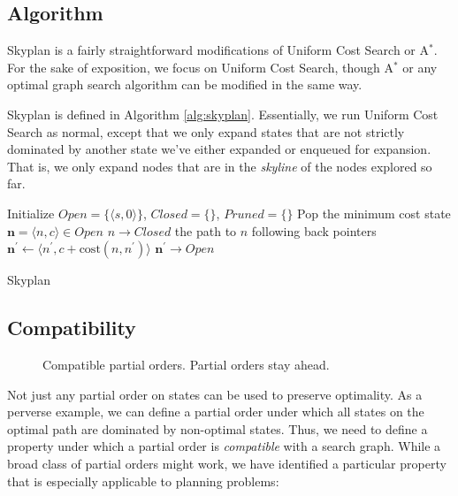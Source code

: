 \documentclass[letterpaper]{article}
\theoremstyle{plain} \newtheorem{theorem}{Theorem} \newtheorem{proposition}{Proposition} \newtheorem{lemma}{Lemma}
\theoremstyle{definition} \newtheorem{definition}{Definition} \newtheorem{conjecture}{Conjecture} \newtheorem*{example}{Example}
\theoremstyle{remark} \newtheorem*{remark}{Remark} \newtheorem*{note}{Note} \newtheorem{case}{Case}
\begin{document}
\subsection{Algorithm}

Skyplan is a fairly straightforward modifications of Uniform
Cost Search or A$^*$. For the sake of exposition, we focus on Uniform Cost
Search, though A$^*$ or any optimal graph search algorithm can
be modified in the same way.

Skyplan is defined in Algorithm \ref{alg:skyplan}. Essentially, we run Uniform Cost Search as normal, except that 
we only expand states that are not strictly dominated by another
state we've either expanded or enqueued for expansion. That is, we only expand nodes that are in the \textit{skyline}
of the nodes explored so far.

\begin{algorithm}
  \begin{algorithmic}[1]
    \State Initialize $Open=\{\langle s,0\rangle\}$, $Closed=\{\}$, $Pruned=\{\}$
    \State Pop the minimum cost state $\mathbf{n} = \langle n,c\rangle\in Open$
      \State $n\rightarrow Closed$
        \State \Return the path to $n$ following back pointers
      \EndIf
      \State $\mathbf{n^\prime} \gets \langle n^\prime,c+\mathrm{cost}(n,n^\prime)\rangle$
        \State $\mathbf{n^\prime} \rightarrow Open$
        \EndIf
      \EndFor
    \EndWhile
  \EndProcedure
  \end{algorithmic}
\caption{Skyplan}
\label{alg:skyplan}
\end{algorithm}

\subsection{Compatibility}
\begin{figure}
  \caption{Compatible partial orders. Partial orders stay ahead.}
\end{figure}

Not just any partial order on states can be used to preserve optimality. As a perverse
example, we can define a partial order under which all states on the optimal path
are dominated by non-optimal states. Thus, we need to define a property
under which a partial order is \textit{compatible} with a search graph. While
a broad class of partial orders might work, we have identified a particular 
property that is especially applicable to planning problems:
\end{document}
